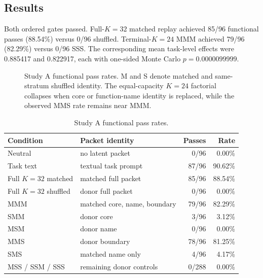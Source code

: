 \documentclass[11pt]{article}
\begin{document}
\subsection{Results}

Both ordered gates passed. Full-\(K=32\) matched replay achieved 85/96 functional passes (88.54\%) versus 0/96 shuffled. Terminal-\(K=24\) MMM achieved 79/96 (82.29\%) versus 0/96 SSS. The corresponding mean task-level effects were 0.885417 and 0.822917, each with one-sided Monte Carlo \(p = 0.0000099999\).

\begin{figure}[htbp]
\centering
{}
\caption{Study A functional pass rates. M and S denote matched and same-stratum shuffled identity. The equal-capacity \(K=24\) factorial collapses when core or function-name identity is replaced, while the observed MMS rate remains near MMM.}
\label{fig:study-a}
\end{figure}

\begin{table}[htbp]
\centering
\caption{Study A functional pass rates.}
\label{tab:study-a-rates}
\small
\begin{tabularx}{\textwidth}{>{\raggedright\arraybackslash}X >{\raggedright\arraybackslash}X r r}
\toprule
Condition & Packet identity & Passes & Rate \\
\midrule
Neutral & no latent packet & 0/96 & 0.00\% \\
Task text & textual task prompt & 87/96 & 90.62\% \\
Full \(K=32\) matched & matched full packet & 85/96 & 88.54\% \\
Full \(K=32\) shuffled & donor full packet & 0/96 & 0.00\% \\
MMM & matched core, name, boundary & 79/96 & 82.29\% \\
SMM & donor core & 3/96 & 3.12\% \\
MSM & donor name & 0/96 & 0.00\% \\
MMS & donor boundary & 78/96 & 81.25\% \\
SMS & matched name only & 4/96 & 4.17\% \\
MSS / SSM / SSS & remaining donor controls & 0/288 & 0.00\% \\
\bottomrule
\end{tabularx}
\end{table}
\end{document}
